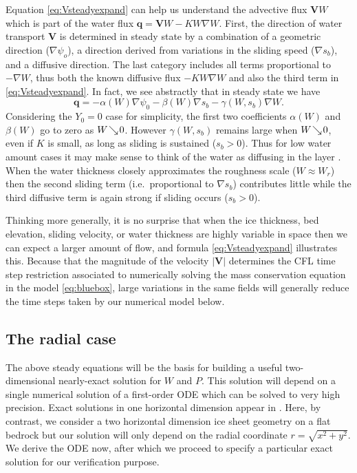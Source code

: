\documentclass[11pt,final]{amsart}%
\newcommand\bV{\mathbf{V}}
\newcommand\bq{\mathbf{q}}
\newcommand{\grad}{\nabla}
\begin{document}
Equation \eqref{eq:Vsteadyexpand} can help us understand the advective flux $\bV W$ which is part of the water flux $\bq=\bV W - K W \grad W$.  First, the direction of water transport $\bV$ is determined in steady state by a combination of a geometric direction ($\grad \psi_o$), a direction derived from variations in the sliding speed ($\grad s_b$), and a diffusive direction.  The last category includes all terms proportional to $-\grad W$, thus both the known diffusive flux $-K W \grad W$ and also the third term in \eqref{eq:Vsteadyexpand}.  In fact, we see abstractly that in steady state we have
	$$\bq = - \alpha(W) \grad \psi_0 - \beta(W) \grad s_b - \gamma(W,s_b) \grad W.$$
Considering the $Y_0=0$ case for simplicity, the first two coefficients $\alpha(W)$ and $\beta(W)$ go to zero as $W\!\searrow\! 0$.  However $\gamma(W,s_b)$ remains large when $W\!\searrow\! 0$, even if $K$ is small, as long as sliding is sustained ($s_b > 0$).  Thus for low water amount cases it may make sense to think of the water as diffusing in the layer \citep[compare equation (11) in][]{BBssasliding}.  When the water thickness closely approximates the roughness scale ($W\approx W_r$) then the second sliding term (i.e.~proportional to $\grad s_b$) contributes little while the third diffusive term is again strong if sliding occurs ($s_b > 0$).

Thinking more generally, it is no surprise that when the ice thickness, bed elevation, sliding velocity, or water thickness are highly variable in space then we can expect a larger amount of flow, and formula \eqref{eq:Vsteadyexpand} illustrates this.  Because that the magnitude of the velocity $|\bV|$ determines the CFL time step restriction \citep{MortonMayers} associated to numerically solving the mass conservation equation in the model \eqref{eq:bluebox}, large variations in the same fields will generally reduce the time steps taken by our numerical model below.


\subsection*{The radial case}  The above steady equations will be the basis for building a useful two-dimensional nearly-exact solution for $W$ and $P$.  This solution will depend on a single numerical solution of a first-order ODE which can be solved to very high precision.  Exact solutions in one horizontal dimension appear in \cite{Schoofetal2012}.  Here, by contrast, we consider a two horizontal dimension ice sheet geometry on a flat bedrock but our solution will only depend on the radial coordinate $r = \sqrt{x^2+y^2}$.  We derive the ODE now, after which we proceed to specify a particular exact solution for our verification purpose.
\end{document}
